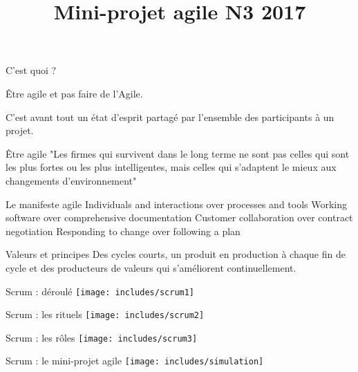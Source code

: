 \documentclass{beamer}
\title{Mini-projet agile N3 2017}
\author{
}
\date{}
\begin{document}
\frame{\titlepage}


\begin{frame}{C'est quoi ?}
 
  {\Large \alert{Être agile} et pas faire de l'Agile.}

  \vspace{6mm}
  C'est avant tout un état d'esprit partagé par l'ensemble des participants à un projet.
\end{frame}

\begin{frame}{Être agile}
  "Les firmes qui survivent dans le long terme ne sont pas celles qui sont les plus fortes ou les plus intelligentes, mais celles qui s'adaptent le mieux aux changements d'environnement"


\end{frame}

\begin{frame}{Le manifeste agile}
  \large
  \alert{Individuals and interactions} over processes and tools\newline
  \alert{Working software} over comprehensive documentation\newline
  \alert{Customer collaboration} over contract negotiation\newline
  \alert{Responding to change} over following a plan
\end{frame}

\begin{frame}{Valeurs et principes}
  \Large Des cycles courts, un produit en production à chaque fin de cycle et des producteurs de valeurs qui s'améliorent continuellement.
\end{frame}

\begin{frame}{Scrum : déroulé}
  \center
  \texttt{[image: includes/scrum1]}
\end{frame}

\begin{frame}{Scrum : les rituels}
  \center
  \texttt{[image: includes/scrum2]}
\end{frame}

\begin{frame}{Scrum : les rôles}
  \center
  \texttt{[image: includes/scrum3]}
\end{frame}

\begin{frame}{Scrum : le mini-projet agile}
  \center
  \texttt{[image: includes/simulation]}
\end{frame}
\end{document}
